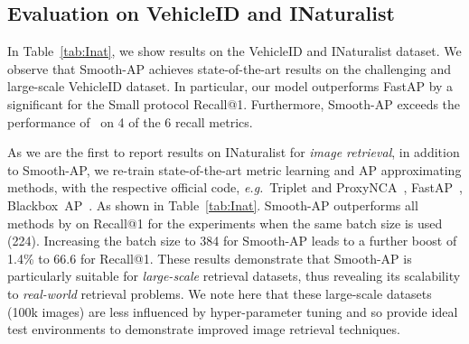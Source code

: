 \documentclass[runningheads]{llncs}
\providecommand{\eg}[0]{\emph{e.g.}}
\begin{document}
\subsection{Evaluation on VehicleID and INaturalist}
\label{sub:eval_inatur}


In Table~\ref{tab:Inat}, we show results on the VehicleID and INaturalist dataset. 
We observe that Smooth-AP achieves state-of-the-art results on the challenging and large-scale VehicleID dataset. In particular, our model outperforms FastAP by a significant  for the Small protocol Recall@1. 
Furthermore, Smooth-AP exceeds the performance of~\cite{wang2020cross} on 4 of the 6 recall metrics. 

As we are the first to report results on INaturalist for {\em image retrieval}, 
in addition to Smooth-AP, 
we re-train state-of-the-art metric learning and AP approximating methods, 
with the respective official code,
\eg~Triplet and ProxyNCA~\cite{triplet_nca}, FastAP~\cite{fast_ap}, Blackbox~AP~\cite{blackbox_ap}.
As shown in Table~\ref{tab:Inat}.
Smooth-AP outperforms all methods by  on Recall@1 for the experiments when the same batch size is used (224). Increasing the batch size to 384 for Smooth-AP leads to a further boost of 1.4\% to 66.6 for Recall@1. These results demonstrate that Smooth-AP is particularly suitable for {\em large-scale} retrieval datasets, 
thus revealing its scalability to {\em real-world} retrieval problems. We note here that these large-scale datasets (100k images) are less influenced by hyper-parameter tuning and so provide ideal test environments to demonstrate improved image retrieval techniques. 
\end{document}

